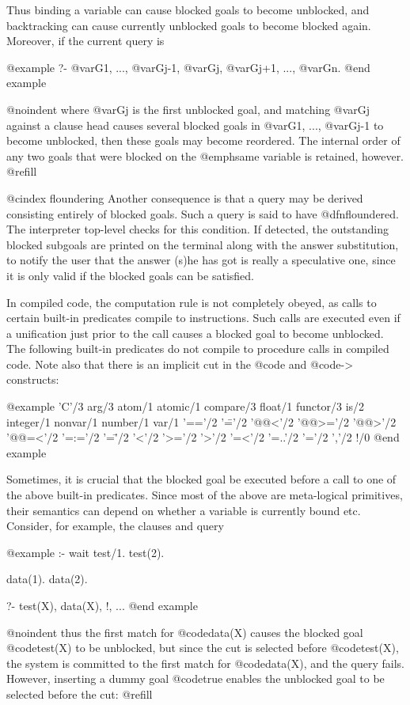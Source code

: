 {Thus binding a variable can cause blocked goals to become unblocked, and
backtracking can cause currently unblocked goals to become blocked
again.  Moreover, if the current query is

@example
?- @var{G1}, ..., @var{Gj-1}, @var{Gj}, @var{Gj+1}, ..., @var{Gn}.
@end example

@noindent
where @var{Gj} is the first unblocked goal, and matching @var{Gj}
against a clause head causes several blocked goals in @var{G1}, ...,
@var{Gj-1} to become unblocked, then these goals may become reordered.
The internal order of any two goals that were blocked on the @emph{same}
variable is retained, however. @refill

@cindex floundering
Another consequence is that a query may be derived consisting entirely
of blocked goals.  Such a query is said to have @dfn{floundered}.  The
interpreter top-level checks for this condition.  If detected, the
outstanding blocked subgoals are printed on the terminal along with the
answer substitution, to notify the user that the answer (s)he has
got is really a speculative one, since it is only valid if the blocked
goals can be satisfied.

In compiled code, the computation rule is not completely obeyed, as
calls to certain built-in predicates compile to instructions.  Such
calls are executed even if a unification just prior to the call causes a
blocked goal to become unblocked.  The following built-in predicates do
not compile to procedure calls in compiled code.  Note also that there is an
implicit cut in the @code{\+} and @code{->} constructs:

@example
'C'/3
arg/3
atom/1
atomic/1
compare/3
float/1
functor/3
is/2
integer/1
nonvar/1
number/1
var/1
'=='/2 '\=='/2 '@@<'/2 '@@>='/2 '@@>'/2 '@@=<'/2
'=:='/2 '=\='/2 '<'/2 '>='/2 '>'/2 '=<'/2
'=..'/2 '='/2 ','/2 !/0
@end example

Sometimes, it is crucial that the blocked goal be executed before a call
to one of the above built-in predicates.  Since most of the above are
meta-logical primitives, their semantics can depend on whether a
variable is currently bound etc.  Consider, for example, the clauses and
query

@example
:- wait test/1.
test(2).

data(1).
data(2).

?- test(X), data(X), !, ...
@end example

@noindent
thus the first match for @code{data(X)} causes the blocked goal
@code{test(X)} to be unblocked, but since the cut is selected before
@code{test(X)}, the system is committed to the first match for
@code{data(X)}, and the query fails.  However, inserting a dummy goal
@code{true} enables the unblocked goal to be selected before the cut: @refill

}

